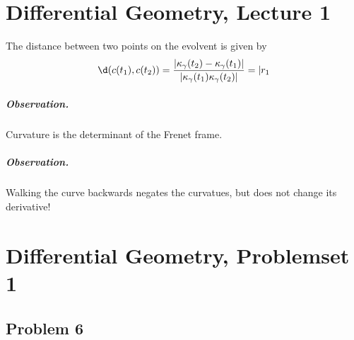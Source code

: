 \chapter{Differential Geometry, Lecture 1}

\begin{lemma}\label{DotProductDifferentiation}

\end{lemma}

\begin{lemma}\label{EvolventDistanceFormula}
    The distance between two points on the evolvent is given by
    \[
        \d (c(t_1), c(t_2) ) = \frac{ \lvert \kappa_\gamma(t_2) - \kappa_\gamma(t_1) \rvert}{\lvert \kappa_\gamma(t_1) \kappa_\gamma(t_2) \rvert } = \lvert r_1
    \]
\end{lemma}

\paragraph{Observation.} Curvature is the determinant of the Frenet frame.
\paragraph{Observation.} Walking the curve backwards negates the curvatues, but does not change its derivative!

\chapter{Differential Geometry, Problemset 1}

\section{Problem 6}

